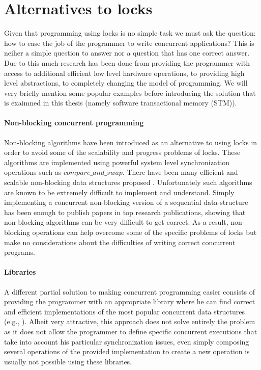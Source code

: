 \section{Alternatives to locks}
Given that programming using locks
is no simple task
we must ask the question:  how to  ease  the  job of  the programmer  to write
concurrent applications?
This is neiher a simple question to answer nor a question that has one correct answer.
Due to this much research has been done from providing the programmer with access to additional
efficient low level hardware operations, to providing high level abstractions, to completely
changing the model of programming.
We will very briefly mention some popular examples before introducing the solution that is
exaimned in this thesis (namely software transactional memory (STM)).

\paragraph{Non-blocking concurrent programming}
Non-blocking algorithms \cite{GC96} have been introduced as an alternative to using
locks in order to avoid some of the scalability and progress problems of locks.
These algorithms are implemented using powerful system level synchronization operations such
as $compare\_and\_swap$.
There have been many efficient and scalable non-blocking data structures proposed
\cite{Mic02,ST04,Val96,FR04,Fra03}.
Unfortunately such algorithms are known to be extremely difficult to implement
and understand.
Simply implementing a concurrent non-blocking version of a sequential data-structure
has been enough to publish papers in top research publications, showing that
non-blocking algorithms can be very difficult to get correct.
As a result, non-blocking operations can help overcome some of the specific problems of locks
but make no considerations about the difficulties of writing correct concurrent programs.


\paragraph{Libraries}
A different partial  solution to making concurrent programming easier consists of providing 
the programmer with an appropriate 
library where  he  can  find  correct  and  efficient  implementations  of  
the most popular concurrent data structures (e.g., \cite{HS08,MS96}). 
Albeit very attractive, this approach does not solve entirely the problem  
as it does not allow the programmer to define  specific concurrent executions 
that take into account  his particular  synchronization issues,
even simply composing several operations of the provided implementation
to create a new operation is usually not possible using these libraries.


